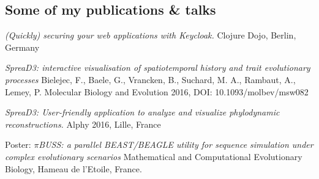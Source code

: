 \documentclass[a4paper, oneside, final]{scrartcl}
\newenvironment{lyxlist}[1]
{\begin{list}{}
{\settowidth{\labelwidth}{#1}
 \setlength{\leftmargin}{\labelwidth}
 \addtolength{\leftmargin}{\labelsep}
 \renewcommand{\makelabel}[1]{##1\hfil}}}
{\end{list}}
\newcommand{\noun}[1]{\textsc{#1}}
\begin{document}
\begin{center}
\section{Some of my publications \& talks}

\begin{lyxlist}{00.00.0000}

\item [{\noun{\scriptsize 2017}}] \emph{(Quickly) securing your web applications with Keycloak. } 
Clojure Dojo, Berlin, Germany


\item [{\noun{\scriptsize 2016}}] \emph{SpreaD3: interactive visualisation of spatiotemporal history and trait evolutionary processes} 
Bielejec, F., Baele, G., Vrancken, B.,  Suchard, M. A., Rambaut, A., Lemey, P.
Molecular Biology and Evolution  2016, DOI: 10.1093/molbev/msw082 


\item [{\noun{\scriptsize 2016}}] \emph{SpreaD3: User-friendly application to analyze and visualize phylodynamic reconstructions. } 
Alphy 2016, Lille, France



\item [{\noun{\scriptsize 2014}}] Poster: \emph{$\pi$BUSS: a parallel BEAST/BEAGLE utility for sequence simulation under complex evolutionary scenarios} 
Mathematical and Computational Evolutionary Biology, Hameau de l'Etoile, France.


\end{lyxlist}
\end{center}
\end{document}
